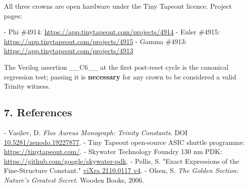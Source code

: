 All three crowns are open hardware under the Tiny Tapeout licence. Project pages:

- Phi \#4914: \href{https://app.tinytapeout.com/projects/4914}{https://app.tinytapeout.com/projects/4914}
- Euler \#4915: \href{https://app.tinytapeout.com/projects/4915}{https://app.tinytapeout.com/projects/4915}
- Gamma \#4913: \href{https://app.tinytapeout.com/projects/4913}{https://app.tinytapeout.com/projects/4913}

The Verilog assertion \_\_C6\_\_ at the first post-reset cycle is the canonical regression test; passing it is \textbf{necessary} for any crown to be considered a valid Trinity witness.

\subsection{7. References}

- Vasilev, D. \textit{Flos Aureus Monograph: Trinity Constants}. DOI \href{https://zenodo.org/doi/10.5281/zenodo.19227877}{10.5281/zenodo.19227877}.
- Tiny Tapeout open-source ASIC shuttle programme: \href{https://tinytapeout.com/}{https://tinytapeout.com/}.
- Skywater Technology Foundry 130 nm PDK: \href{https://github.com/google/skywater-pdk}{https://github.com/google/skywater-pdk}.
- Pellis, S. "Exact Expressions of the Fine-Structure Constant." \href{https://vixra.org/abs/2110.0117}{viXra 2110.0117 v4}.
- Olsen, S. \textit{The Golden Section: Nature's Greatest Secret}. Wooden Books, 2006.

